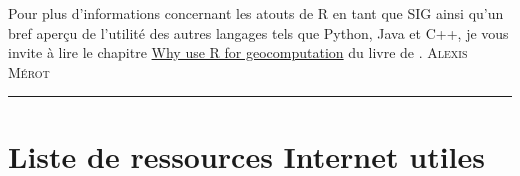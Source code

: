 \documentclass[
]{book}
\begin{document}
Pour plus d'informations concernant les atouts de R en tant que SIG ainsi qu'un
bref aperçu de l'utilité des autres langages tels que Python, Java et C++, je
vous invite à lire le chapitre \href{https://geocompr.robinlovelace.net/intro.html\#why-use-r-for-geocomputation}{Why use R for
geocomputation}
du livre de \citet{geocomputation}. \textsc{Alexis Mérot}

\begin{center}\rule{0.5\linewidth}{0.5pt}\end{center}

\hypertarget{ref-sig}{%
\section*{Liste de ressources Internet utiles}\label{ref-sig}}
\end{document}
